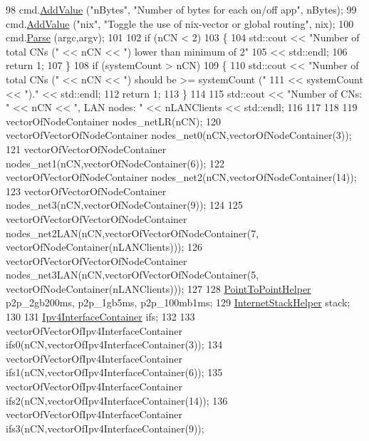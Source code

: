 \begin{DoxyCode}
98   cmd.\hyperlink{classns3_1_1CommandLine_addcfb546c7ad4c8bd0965654d55beb8e}{AddValue} (\textcolor{stringliteral}{"nBytes"}, \textcolor{stringliteral}{"Number of bytes for each on/off app"}, nBytes);
99   cmd.\hyperlink{classns3_1_1CommandLine_addcfb546c7ad4c8bd0965654d55beb8e}{AddValue} (\textcolor{stringliteral}{"nix"}, \textcolor{stringliteral}{"Toggle the use of nix-vector or global routing"}, nix);
100   cmd.\hyperlink{classns3_1_1CommandLine_a5c10b85b3207e5ecb48d907966923156}{Parse} (argc,argv);
101 
102   \textcolor{keywordflow}{if} (nCN < 2)
103     \{
104       std::cout << \textcolor{stringliteral}{"Number of total CNs ("} << nCN << \textcolor{stringliteral}{") lower than minimum of 2"}
105            << std::endl;
106       \textcolor{keywordflow}{return} 1;
107     \}
108   \textcolor{keywordflow}{if} (systemCount > nCN)
109     \{
110       std::cout << \textcolor{stringliteral}{"Number of total CNs ("} << nCN << \textcolor{stringliteral}{") should be >= systemCount ("}
111            << systemCount << \textcolor{stringliteral}{")."} << std::endl;
112       \textcolor{keywordflow}{return} 1;
113     \}
114 
115   std::cout << \textcolor{stringliteral}{"Number of CNs: "} << nCN << \textcolor{stringliteral}{", LAN nodes: "} << nLANClients << std::endl;
116   
117 
118 
119   vectorOfNodeContainer nodes\_netLR(nCN);
120   vectorOfVectorOfNodeContainer nodes\_net0(nCN,vectorOfNodeContainer(3));
121   vectorOfVectorOfNodeContainer nodes\_net1(nCN,vectorOfNodeContainer(6));
122   vectorOfVectorOfNodeContainer nodes\_net2(nCN,vectorOfNodeContainer(14));
123   vectorOfVectorOfNodeContainer nodes\_net3(nCN,vectorOfNodeContainer(9));
124      
125   vectorOfVectorOfVectorOfNodeContainer nodes\_net2LAN(nCN,vectorOfVectorOfNodeContainer(7,
      vectorOfNodeContainer(nLANClients)));
126   vectorOfVectorOfVectorOfNodeContainer nodes\_net3LAN(nCN,vectorOfVectorOfNodeContainer(5,
      vectorOfNodeContainer(nLANClients)));
127   
128   \hyperlink{classns3_1_1PointToPointHelper}{PointToPointHelper} p2p\_2gb200ms, p2p\_1gb5ms, p2p\_100mb1ms;
129   \hyperlink{classns3_1_1InternetStackHelper}{InternetStackHelper} stack;
130   
131   \hyperlink{classns3_1_1Ipv4InterfaceContainer}{Ipv4InterfaceContainer} ifs;  
132 
133   vectorOfVectorOfIpv4InterfaceContainer ifs0(nCN,vectorOfIpv4InterfaceContainer(3));
134   vectorOfVectorOfIpv4InterfaceContainer ifs1(nCN,vectorOfIpv4InterfaceContainer(6));
135   vectorOfVectorOfIpv4InterfaceContainer ifs2(nCN,vectorOfIpv4InterfaceContainer(14));
136   vectorOfVectorOfIpv4InterfaceContainer ifs3(nCN,vectorOfIpv4InterfaceContainer(9));

\end{DoxyCode}
